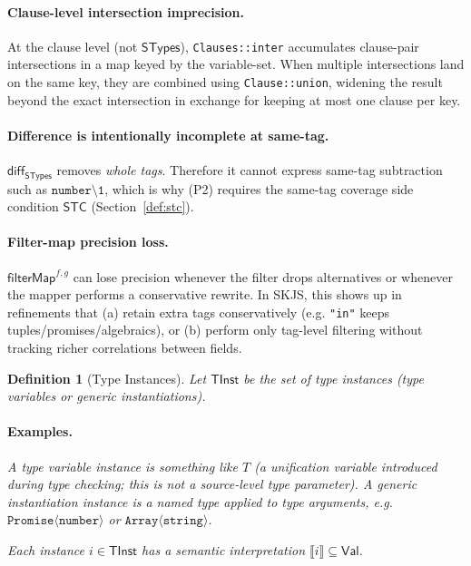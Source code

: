 \documentclass[11pt]{article}
\newtheorem{definition}[theorem]{Definition}
\newcommand{\sem}[1]{\llbracket #1 \rrbracket}
\newcommand{\diff}{\mathsf{diff}}
\newcommand{\STypes}{\mathsf{STypes}}
\newcommand{\TInst}{\mathsf{TInst}}
\newcommand{\Val}{\mathsf{Val}}
\begin{document}
\paragraph{Clause-level intersection imprecision.}
At the clause level (not \(\STypes\)), \texttt{Clauses::inter} accumulates clause-pair intersections in a map keyed by the variable-set.
When multiple intersections land on the same key, they are combined using \texttt{Clause::union}, widening the result beyond the exact intersection in exchange for keeping at most one clause per key.

\paragraph{Difference is intentionally incomplete at same-tag.}
\(\diff_{\STypes}\) removes \emph{whole tags}. Therefore it cannot express same-tag subtraction such as \(\texttt{number} \setminus \texttt{1}\), which is why (P2) requires the same-tag coverage side condition \(\mathsf{STC}\) (Section~\ref{def:stc}).

\paragraph{Filter-map precision loss.}
\(\mathsf{filterMap}^{f,g}\) can lose precision whenever the filter drops alternatives or whenever the mapper performs a conservative rewrite. In SKJS, this shows up in refinements that (a) retain extra tags conservatively (e.g. \texttt{"in"} keeps tuples/promises/algebraics), or (b) perform only tag-level filtering without tracking richer correlations between fields.

\begin{definition}[Type Instances]
\label{def:type-instances}
Let $\TInst$ be the set of type instances (type variables or generic instantiations).
\paragraph{Examples.}
A type variable instance is something like $T$ (a unification variable introduced during type checking; this is \emph{not} a source-level type parameter).
A generic instantiation instance is a named type applied to type arguments, e.g. $\texttt{Promise}\langle \texttt{number} \rangle$ or $\texttt{Array}\langle \texttt{string} \rangle$.

Each instance $i \in \TInst$ has a semantic interpretation $\sem{i} \subseteq \Val$.
\end{definition}
\end{document}

